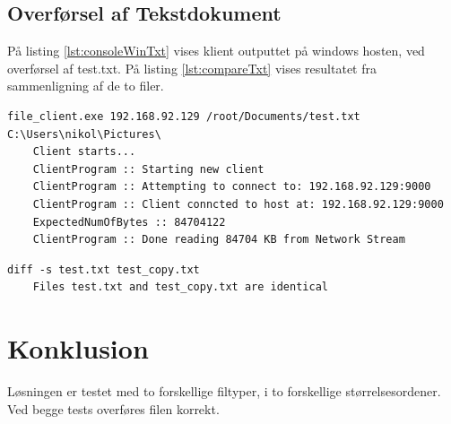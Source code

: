 \newpage
\subsection{Overførsel af Tekstdokument}
På listing \ref{lst:consoleWinTxt} vises klient outputtet på windows hosten, ved overførsel af test.txt. På listing \ref{lst:compareTxt} vises resultatet fra sammenligning af de to filer.
\begin{lstlisting}[caption=Konsol output fra windows klient, label=lst:consoleWinTxt]
	file_client.exe 192.168.92.129 /root/Documents/test.txt C:\Users\nikol\Pictures\
	Client starts...
	ClientProgram :: Starting new client
	ClientProgram :: Attempting to connect to: 192.168.92.129:9000
	ClientProgram :: Client conncted to host at: 192.168.92.129:9000
	ExpectedNumOfBytes :: 84704122
	ClientProgram :: Done reading 84704 KB from Network Stream
\end{lstlisting}

\begin{lstlisting}[caption=Konsol output fra sammenligning, label=lst:compareTxt]
	diff -s test.txt test_copy.txt
	Files test.txt and test_copy.txt are identical
\end{lstlisting}

\section{Konklusion}
Løsningen er testet med to forskellige filtyper, i to forskellige størrelsesordener. Ved begge tests overføres filen korrekt.

